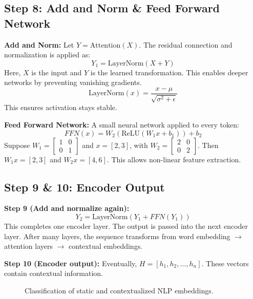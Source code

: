 \documentclass[10pt, conference]{IEEEtran}
\begin{document}
\subsection{\textbf{Step 8: Add and Norm \& Feed Forward Network}}
\textbf{Add and Norm:} 
Let $Y = \text{Attention}(X)$. The residual connection and normalization is applied as:
\begin{equation}
    Y_1 = \text{LayerNorm}(X + Y)
\end{equation}
Here, $X$ is the input and $Y$ is the learned transformation. This enables deeper networks by preventing vanishing gradients.
\begin{equation}
    \text{LayerNorm}(x) = \frac{x - \mu}{\sqrt{\sigma^2 + \epsilon}}
\end{equation}
This ensures activation stays stable.

\textbf{Feed Forward Network:} A small neural network applied to every token:
\begin{equation}
    FFN(x) = W_2(\text{ReLU}(W_1x + b_1)) + b_2
\end{equation}
Suppose $W_1 = \begin{bmatrix} 1 & 0 \\ 0 & 1 \end{bmatrix}$ and $x = [2, 3]$, with $W_2 = \begin{bmatrix} 2 & 0 \\ 0 & 2 \end{bmatrix}$. 
Then $W_1x = [2, 3]$ and $W_2x = [4, 6]$. This allows non-linear feature extraction.

\subsection{\textbf{Step 9 \& 10: Encoder Output}}
\textbf{Step 9 (Add and normalize again):}
\begin{equation}
    Y_2 = \text{LayerNorm}(Y_1 + FFN(Y_1))
\end{equation}
This completes one encoder layer. The output is passed into the next encoder layer. After many layers, the sequence transforms from word embedding $\rightarrow$ attention layers $\rightarrow$ contextual embeddings.

\textbf{Step 10 (Encoder output):}
Eventually, $H = [h_1, h_2, \dots, h_n]$. These vectors contain contextual information.

\begin{figure}[h]
\centering
{}
\caption{Classification of static and contextualized NLP embeddings.}
\label{fig:embeddings_nlp}
\end{figure}
\end{document}
